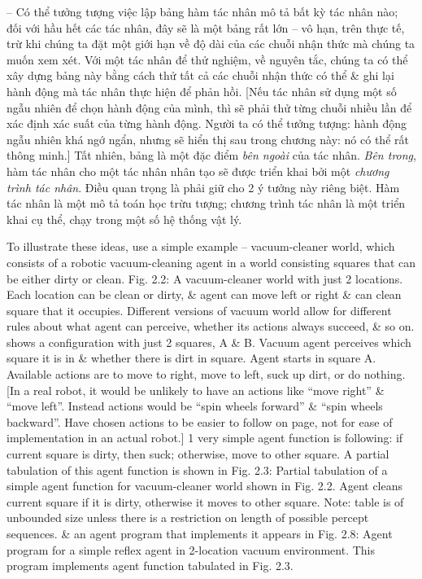 \documentclass{article}
\begin{document}
\begin{itemize}
\begin{itemize}
\begin{itemize}
			-- Có thể tưởng tượng việc lập bảng hàm tác nhân mô tả bất kỳ tác nhân nào; đối với hầu hết các tác nhân, đây sẽ là một bảng rất lớn -- vô hạn, trên thực tế, trừ khi chúng ta đặt một giới hạn về độ dài của các chuỗi nhận thức mà chúng ta muốn xem xét. Với một tác nhân để thử nghiệm, về nguyên tắc, chúng ta có thể xây dựng bảng này bằng cách thử tất cả các chuỗi nhận thức có thể \& ghi lại hành động mà tác nhân thực hiện để phản hồi. [Nếu tác nhân sử dụng một số ngẫu nhiên để chọn hành động của mình, thì sẽ phải thử từng chuỗi nhiều lần để xác định xác suất của từng hành động. Người ta có thể tưởng tượng: hành động ngẫu nhiên khá ngớ ngẩn, nhưng sẽ hiển thị sau trong chương này: nó có thể rất thông minh.] Tất nhiên, bảng là một đặc điểm {\it bên ngoài} của tác nhân. {\it Bên trong}, hàm tác nhân cho một tác nhân nhân tạo sẽ được triển khai bởi một {\it chương trình tác nhân}. Điều quan trọng là phải giữ cho 2 ý tưởng này riêng biệt. Hàm tác nhân là một mô tả toán học trừu tượng; chương trình tác nhân là một triển khai cụ thể, chạy trong một số hệ thống vật lý.
			
			To illustrate these ideas, use a simple example -- vacuum-cleaner world, which consists of a robotic vacuum-cleaning agent in a world consisting squares that can be either dirty or clean. {\sf Fig. 2.2: A vacuum-cleaner world with just 2 locations. Each location can be clean or dirty, \& agent can move left or right \& can clean square that it occupies. Different versions of vacuum world allow for different rules about what agent can perceive, whether its actions always succeed, \& so on.} shows a configuration with just 2 squares, A \& B. Vacuum agent perceives which square it is in \& whether there is dirt in square. Agent starts in square A. Available actions are to move to right, move to left, suck up dirt, or do nothing. [In a real robot, it would be unlikely to have an actions like ``move right'' \& ``move left''. Instead actions would be ``spin wheels forward'' \& ``spin wheels backward''. Have chosen actions to be easier to follow on page, not for ease of implementation in an actual robot.] 1 very simple agent function is following: if current square is dirty, then suck; otherwise, move to other square. A partial tabulation of this agent function is shown in {\sf Fig. 2.3: Partial tabulation of a simple agent function for vacuum-cleaner world shown in Fig. 2.2. Agent cleans current square if it is dirty, otherwise it moves to other square. Note: table is of unbounded size unless there is a restriction on length of possible percept sequences.} \& an agent program that implements it appears in {\sf Fig. 2.8: Agent program for a simple reflex agent in 2-location vacuum environment. This program implements agent function tabulated in Fig. 2.3.}
			

\end{itemize}
\end{itemize}
\end{itemize}
\end{document}
